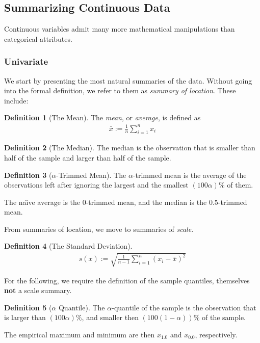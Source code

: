 \documentclass[12pt,a4paper]{report}
\theoremstyle{plain}
\theoremstyle{definition}
\newtheorem{definition}{Definition}
\newcommand{\naive}{na\"{\i}ve }
\begin{document}
\subsection{Summarizing  Continuous Data}
Continuous variables admit many more mathematical manipulations than categorical attributes. 


\subsubsection{Univariate}

We start by presenting the most natural summaries of the data. Without going into the formal definition, we refer to them as \emph{summary of location}.
These include:

\begin{definition}[The Mean]
The \emph{mean}, or \emph{average}, is defined as 
\begin{align}
	\bar{x}:= \frac{1}{n}\sum_{i=1}^{n} x_i
\end{align}
\end{definition}

\begin{definition}[The Median]
The median is the observation that is smaller than half of the sample and larger than half of the sample.
\end{definition}

\begin{definition}[$\alpha$-Trimmed Mean]
The $\alpha$-trimmed mean is the average of the observations left after ignoring the largest and the smallest $(100\alpha) \%$ of them.
\end{definition}
The \naive average is the $0$-trimmed mean, and the median is the $0.5$-trimmed mean.

From summaries of location, we move to summaries of \emph{scale}. 

\begin{definition}[The Standard Deviation]
\begin{align}
	s(x):= \sqrt{\frac{1}{n-1} \sum_{i=1}^{n} (x_i-\bar{x})^2}
\end{align}
\end{definition}

For the following, we require the definition of the sample quantiles, themselves \textbf{not} a scale summary.

\begin{definition}[$\alpha$ Quantile]
The $\alpha$-quantile of the sample is the observation that is larger than $(100\alpha)\%$, and smaller then  $(100(1-\alpha))\%$ of the sample. 
\end{definition}
The empirical maximum and minimum are then $x_{1.0}$ and $x_{0.0}$, respectively.
\end{document}
